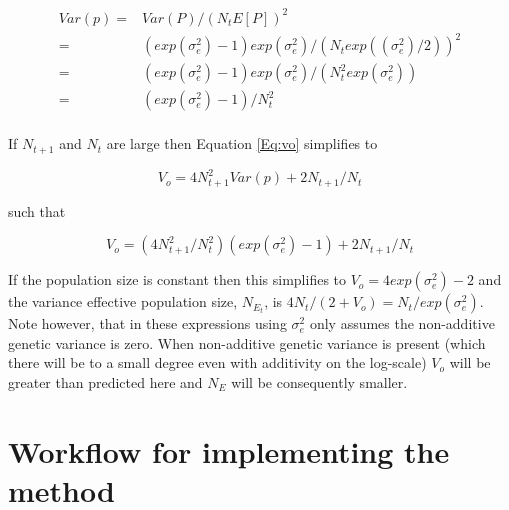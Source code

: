 \documentclass[12pt]{article}
\begin{document}
\begin{bibunit}
\begin{equation}
\begin{array}{rl}
Var(p) =& Var(P)/(N_tE[P])^2\\
=&(exp(\sigma_e^2)-1)exp(\sigma_e^2)/(N_texp((\sigma_e^2)/2))^2\\
       =& (exp(\sigma_e^2)-1)exp(\sigma_e^2)/(N_t^2exp(\sigma_e^2))\\
       =& (exp(\sigma_e^2)-1)/N_t^2\\
\end{array}
\end{equation}

If $N_{t+1}$ and $N_t$ are large then Equation \ref{Eq:vo} simplifies to

\begin{equation}
V_o = 4N^2_{t+1}Var(p)+2N_{t+1}/N_t
\end{equation}

such that 

\begin{equation}
V_o = (4N^2_{t+1}/N^2_t)(exp(\sigma^2_e)-1)+2N_{t+1}/N_t
\end{equation}

If the population size is constant then this simplifies to $V_o = 4exp(\sigma^2_e)-2$ and the variance effective population size, $N_{E_t}$, is $4N_t/(2+V_o)=N_t/exp(\sigma^2_e)$. Note however, that in these expressions using $\sigma^2_e$ only assumes the non-additive genetic variance is zero. When non-additive genetic variance is present (which there will be to a small degree even with additivity on the log-scale) $V_o$ will be greater than predicted here and $N_E$ will be consequently smaller.


\section{Workflow for implementing the method}
\label{App:workflow}


\end{bibunit}
\end{document}
